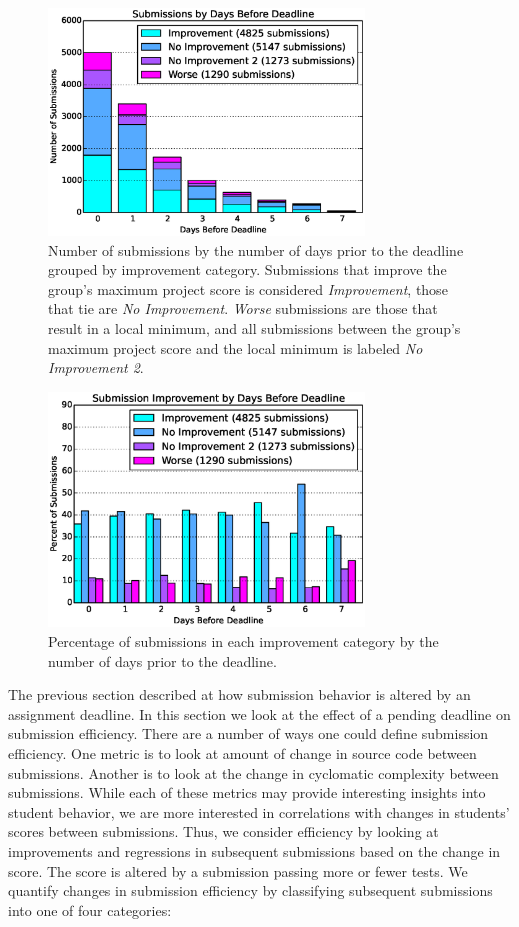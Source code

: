 \begin{figure}[!t]
\centering \includegraphics[width=3.3in]{graphs/Submissions_by_Days_Before_Deadline.eps}
\caption{Number of submissions by the number of days prior to the deadline
  grouped by improvement category.  Submissions that improve the group's
  maximum project score is considered \emph{Improvement}, those that tie are
  \emph{No Improvement}. \emph{Worse} submissions are those that result in a
  local minimum, and all submissions between the group's maximum project score
  and the local minimum is labeled \emph{No Improvement 2}.}
\end{figure}

\begin{figure}[!t]
\centering \includegraphics[width=3.3in]{graphs/Submission_Improvement_by_Days_Before_Deadline.eps}
\caption{Percentage of submissions in each improvement category by the number
  of days prior to the deadline.}
\end{figure}

The previous section described at how submission behavior is altered by an
assignment deadline. In this section we look at the effect of a pending
deadline on submission efficiency. There are a number of ways one could define
submission efficiency. One metric is to look at amount of change in source code
between submissions. Another is to look at the change in cyclomatic complexity
between submissions. While each of these metrics may provide interesting
insights into student behavior, we are more interested in correlations with
changes in students' scores between submissions. Thus, we consider efficiency
by looking at improvements and regressions in subsequent submissions based on
the change in score. The score is altered by a submission passing more or fewer
tests. We quantify changes in submission efficiency by classifying subsequent
submissions into one of four categories:


